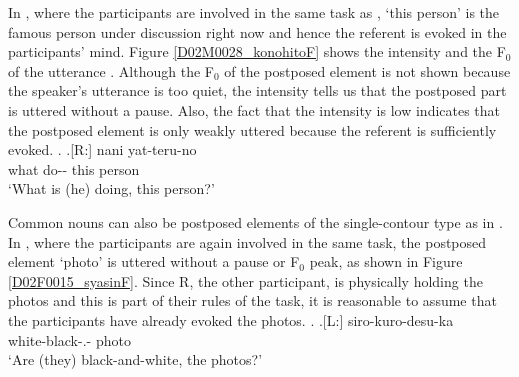 In \Next,
where the participants are involved in the same task as \Last,
 `this person' is the famous person under discussion right now and hence the referent is evoked in the participants' mind.
Figure \ref{D02M0028_konohitoF} shows the intensity and the F$_{0}$ of the utterance \Next.
Although the F$_{0}$ of the postposed element is not shown because the speaker's utterance is too quiet,
the intensity tells us that
the postposed part is uttered without a pause.
Also, the fact that the intensity is low indicates that the postposed element is only weakly uttered because the referent is sufficiently evoked.
%
\ex.\label{D02M0028_konohito}
	\ag.[R:] nani yat-teru-no   \\
			what do-- this person \\
			`What is (he) doing, this person?'

Common nouns can also be postposed elements of the single-contour type as in \Next.
In \Next, where the participants are again involved in the same task,
the postposed element  `photo' is uttered without a pause or F$_{0}$ peak, as shown in Figure \ref{D02F0015_syasinF}.
Since R, the other participant, is physically holding the photos and this is part of their rules of the task,
it is reasonable to assume that the participants have already evoked the photos.
%
\ex.\label{D02F0015_syasin}
	\ag.[L:] siro-kuro-desu-ka  \\
		white-black-.- photo \\
		`Are (they) black-and-white, the photos?'

